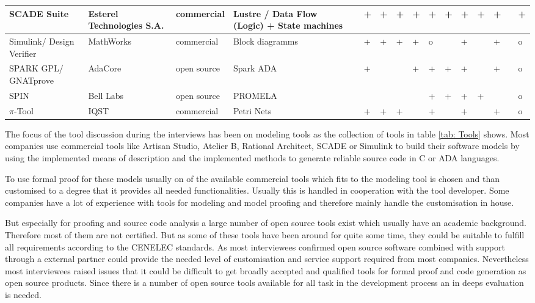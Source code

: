 \documentclass{./template/openetcs_report}
\begin{document}
\begin{landscape}
\begin{center}
\begin{longtable}{|m{2.5cm}|p{3cm}|m{1.8cm}|p{3.5cm}||m{1.2cm}|m{0.2cm}|m{0.2cm}|m{0.2cm}|m{0.7cm}|m{0.2cm}|m{0.7cm}|m{0.2cm}|m{0.6cm}|m{1.2cm}|m{0.2cm}|m{0.2cm}|}
SCADE Suite &Esterel Technologies S.A.&commercial&Lustre / Data Flow (Logic) + State machines&&+&+&+&+&+&+&+&+&+&&+ \\ \hline
Simulink/ Design Verifier&MathWorks&commercial&Block diagramms&&+&+&+&+&o&&+&&+&&o \\ \hline
SPARK GPL/ GNATprove&AdaCore&open source&Spark ADA&&+&&&+&+&+&+&&+&&o \\ \hline
SPIN&Bell Labs&open source&PROMELA&&&&&&+&+&+&+&&&o \\ \hline
$\pi$-Tool&IQST&commercial&Petri Nets&&+&+&+&&+&&+&&+&&o \\ \hline

\end{longtable}

\end{center}
\end{landscape}

The focus of the tool discussion during the interviews has been on modeling tools as the collection of tools in table \ref{tab: Tools} shows. Most companies use commercial tools like Artisan Studio, Atelier B,  Rational Architect,  SCADE or Simulink to build their software models by using the implemented means of description and the implemented methods to generate reliable source code in C or ADA languages. 

To use formal proof for these models usually on of the available commercial tools which fits to the modeling tool is chosen and than customised to a degree that it provides all needed functionalities. Usually this is handled in cooperation with the tool developer. Some companies have a lot of experience with tools for modeling and model proofing and therefore mainly handle the customisation in house.

But especially for proofing and source code analysis a large number of open source tools exist which usually have an academic background. Therefore most of them are not certified. But as some of these tools have been around for quite some time, they could be suitable to fulfill all requirements according to the CENELEC standards. As most interviewees confirmed open source software combined with support through a external partner could provide the needed level of customisation and service support required from most companies. Nevertheless most interviewees raised issues that it could be difficult to get broadly accepted and qualified tools for formal proof and code generation as open source products. Since there is a number of open source tools available for all task in the development process an in deeps evaluation is needed. 
\end{document}
